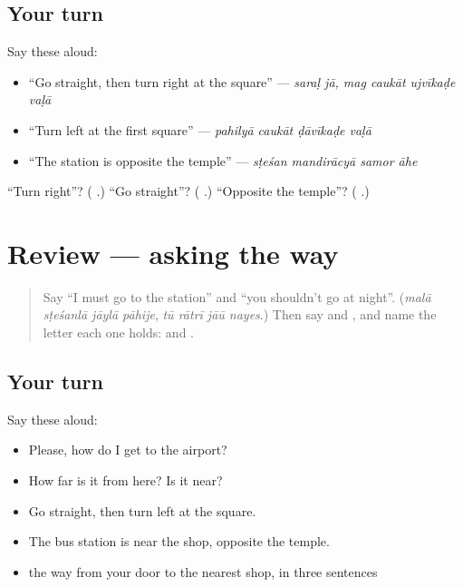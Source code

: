 \subsection*{Your turn}
Say these aloud:

\begin{itemize}
\raggedright
  \item \textquotedblleft{}Go straight, then turn right at the square\textquotedblright{} — \emph{saraḷ jā, mag caukāt ujvīkaḍe vaḷā}
  \item \textquotedblleft{}Turn left at the first square\textquotedblright{} — \emph{pahilyā caukāt ḍāvīkaḍe vaḷā}
  \item \textquotedblleft{}The station is opposite the temple\textquotedblright{} — \emph{sṭeśan mandirācyā samor āhe}
\end{itemize}

\begin{tcolorbox}[breakable,colback=teal!4,colframe=teal!35!black,title={Before you move on}]
\textquotedblleft{}Turn right\textquotedblright{}? (\textbf{ }.) \textquotedblleft{}Go straight\textquotedblright{}? (\textbf{ }.) \textquotedblleft{}Opposite the temple\textquotedblright{}? (\textbf{ }.)
\end{tcolorbox}
\section[(review)]{Review — asking the way}

\label{lesson:MR-R282-asking-the-way}



\begin{quote}
Say \textquotedblleft{}I must go to the station\textquotedblright{} and \textquotedblleft{}you shouldn't go at night\textquotedblright{}. (\emph{malā sṭeśanlā jāylā pāhije}, \emph{tū rātrī jāū nayes}.) Then say \textbf{} and \textbf{}, and name the letter each one holds: \textbf{} and \textbf{}.
\end{quote}

\subsection*{Your turn}
Say these aloud:

\begin{itemize}
\raggedright
  \item Please, how do I get to the airport?
  \item How far is it from here? Is it near?
  \item Go straight, then turn left at the square.
  \item The bus station is near the shop, opposite the temple.
  \item the way from your door to the nearest shop, in three sentences
\end{itemize}

